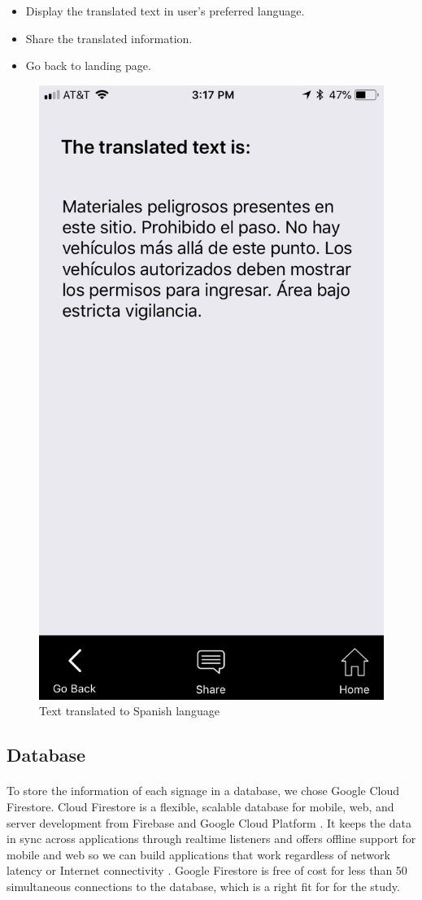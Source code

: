 \documentclass[12pt]{article}
\begin{document}
\begin{itemize}
	\item Display the translated text in user's preferred language.
	\item Share the translated information.
	\item Go back to landing page.
\end{itemize}




\begin{figure}[H]
	\centering
	\includegraphics[width=0.5\linewidth]{media/beacon3.PNG}
	\caption{Text translated to Spanish language}
	\label{fig:beaconSpanish}
\end{figure} 






\subsection{Database}
\label{database}
\paragraph{}To store the information of each signage in a database, we chose Google Cloud Firestore. Cloud Firestore is a flexible, scalable database for mobile, web, and server development from Firebase and Google Cloud Platform \cite{firebase}. It keeps the data in sync across applications through realtime listeners and offers offline support for mobile and web so we can build applications that work regardless of network latency or Internet connectivity \cite{firebase}. Google Firestore is free of cost for less than 50 simultaneous connections to the database, which is a right fit for for the study.
\end{document}
